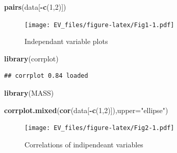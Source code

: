 \documentclass[]{article}
\newenvironment{Shaded}{\begin{snugshade}}{\end{snugshade}}
\newcommand{\KeywordTok}[1]{\textcolor[rgb]{0.13,0.29,0.53}{\textbf{#1}}}
\newcommand{\DataTypeTok}[1]{\textcolor[rgb]{0.13,0.29,0.53}{#1}}
\newcommand{\DecValTok}[1]{\textcolor[rgb]{0.00,0.00,0.81}{#1}}
\newcommand{\StringTok}[1]{\textcolor[rgb]{0.31,0.60,0.02}{#1}}
\newcommand{\OperatorTok}[1]{\textcolor[rgb]{0.81,0.36,0.00}{\textbf{#1}}}
\newcommand{\NormalTok}[1]{#1}
\begin{document}
\begin{Shaded}
\begin{Highlighting}[]
\KeywordTok{pairs}\NormalTok{(data[}\OperatorTok{-}\KeywordTok{c}\NormalTok{(}\DecValTok{1}\NormalTok{,}\DecValTok{2}\NormalTok{)])}
\end{Highlighting}
\end{Shaded}

\begin{figure}
\centering
\texttt{[image: EV\_files/figure-latex/Fig1-1.pdf]}
\caption{Independant variable plots}
\end{figure}

\begin{Shaded}
\begin{Highlighting}[]
\KeywordTok{library}\NormalTok{(corrplot)}
\end{Highlighting}
\end{Shaded}

\begin{verbatim}
## corrplot 0.84 loaded
\end{verbatim}

\begin{Shaded}
\begin{Highlighting}[]
\KeywordTok{library}\NormalTok{(MASS)}
\end{Highlighting}
\end{Shaded}

\begin{Shaded}
\begin{Highlighting}[]
\KeywordTok{corrplot.mixed}\NormalTok{(}\KeywordTok{cor}\NormalTok{(data[}\OperatorTok{-}\KeywordTok{c}\NormalTok{(}\DecValTok{1}\NormalTok{,}\DecValTok{2}\NormalTok{)]),}\DataTypeTok{upper=}\StringTok{"ellipse"}\NormalTok{)}
\end{Highlighting}
\end{Shaded}

\begin{figure}
\centering
\texttt{[image: EV\_files/figure-latex/Fig2-1.pdf]}
\caption{Correlations of indipendeant variables}
\end{figure}
\end{document}
